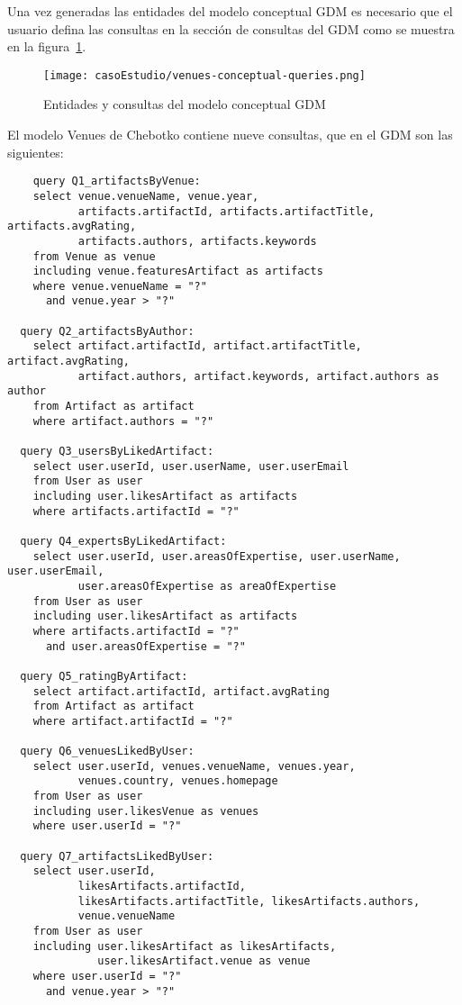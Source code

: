 Una vez generadas las entidades del modelo conceptual GDM es necesario que el usuario defina las consultas en la sección de consultas del GDM como se muestra en la figura~\ref{img:venues-conceptual-queries}.

\begin{figure}[H]
    \centering
    \texttt{[image: casoEstudio/venues-conceptual-queries.png]}
    \caption{Entidades y consultas del modelo conceptual GDM}
    \label{img:venues-conceptual-queries}
\end{figure}

El modelo Venues de  Chebotko contiene nueve consultas, que en el GDM son las siguientes:

\begin{verbatim}
    query Q1_artifactsByVenue:
    select venue.venueName, venue.year,
           artifacts.artifactId, artifacts.artifactTitle, artifacts.avgRating,
           artifacts.authors, artifacts.keywords
    from Venue as venue
    including venue.featuresArtifact as artifacts
    where venue.venueName = "?"
      and venue.year > "?"
  
  query Q2_artifactsByAuthor:
    select artifact.artifactId, artifact.artifactTitle, artifact.avgRating,
           artifact.authors, artifact.keywords, artifact.authors as author
    from Artifact as artifact
    where artifact.authors = "?"
  
  query Q3_usersByLikedArtifact:
    select user.userId, user.userName, user.userEmail
    from User as user
    including user.likesArtifact as artifacts
    where artifacts.artifactId = "?"
  
  query Q4_expertsByLikedArtifact:
    select user.userId, user.areasOfExpertise, user.userName, user.userEmail,
           user.areasOfExpertise as areaOfExpertise
    from User as user
    including user.likesArtifact as artifacts
    where artifacts.artifactId = "?"
      and user.areasOfExpertise = "?"
  
  query Q5_ratingByArtifact:
    select artifact.artifactId, artifact.avgRating
    from Artifact as artifact
    where artifact.artifactId = "?"
  
  query Q6_venuesLikedByUser:
    select user.userId, venues.venueName, venues.year,
           venues.country, venues.homepage
    from User as user
    including user.likesVenue as venues
    where user.userId = "?"
  
  query Q7_artifactsLikedByUser:
    select user.userId,
           likesArtifacts.artifactId,
           likesArtifacts.artifactTitle, likesArtifacts.authors,
           venue.venueName
    from User as user
    including user.likesArtifact as likesArtifacts,
              user.likesArtifact.venue as venue
    where user.userId = "?"
      and venue.year > "?"
  

\end{verbatim}
